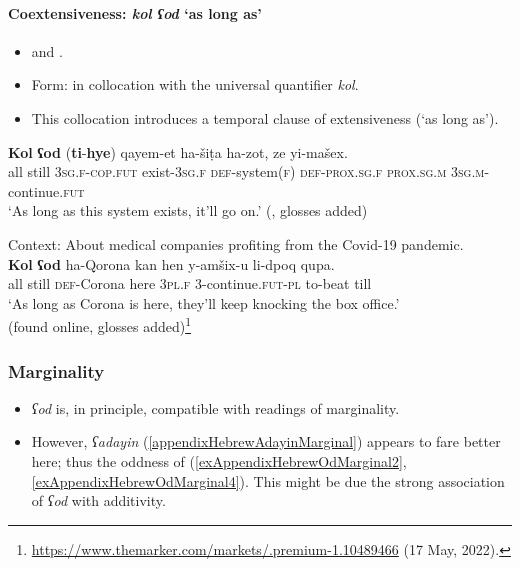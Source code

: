 \paragraph{Coextensiveness: \textit{kol ʕod} \lq as long as'}
\label{appendixHebrewOdAsLongAs}
\begin{itemize}
	\item \textcite[548]{Glinert1989} and \textcite[37]{Schwarzwald2001}.
	\item Form: in collocation with the universal quantifier \textit{kol}.
	\item This collocation introduces a temporal clause of extensiveness (\lq as long as').
\end{itemize}	
\begin{exe}
\ex
	\gll \textbf{Kol} \textbf{ʕod} (\textbf{ti}-\textbf{hye}) qayem-et ha-šiṭa ha-zot, ze yi-mašex.\\
	all still \phantom{(}3\textsc{sg}.\textsc{f}-\textsc{cop}.\textsc{fut} exist-3\textsc{sg}.\textsc{f} \textsc{def}-system(\textsc{f}) \textsc{def}-\textsc{prox}.\textsc{sg}.\textsc{f} \textsc{prox}.\textsc{sg}.\textsc{m} 3\textsc{sg}.\textsc{m}-continue.\textsc{fut}\\
	\glt \lq As long as this system exists, it'll go on.\rq{ }(\cite[548]{Glinert1989}, glosses added)
	
	\ex Context: About medical companies profiting from the Covid-19 pandemic.\\
	\gll \textbf{Kol} \textbf{ʕod} ha-Qorona kan hen y-amšix-u li-dpoq qupa.\\
all still \textsc{def}-Corona here 3\textsc{pl}.\textsc{f} 3-continue.\textsc{fut}-\textsc{pl} to-beat till\\
	\glt \lq As long as Corona is here, they'll keep knocking the box office.'\\(found online, glosses added)\footnote{\url{https://www.themarker.com/markets/.premium-1.10489466} (17 May, 2022).}
\end{exe}
	
\subsubsection{Marginality}
\label{appendixHebrewOdMarginal}
\begin{itemize}
	\item \textit{ʕod} is, in principle, compatible with readings of marginality. 
	\item However, \textit{ʕadayin} (\ref{appendixHebrewAdayinMarginal}) appears to fare better here; thus the oddness of (\ref{exAppendixHebrewOdMarginal2}, \ref{exAppendixHebrewOdMarginal4}). This might be due the strong association of \textit{ʕod} with additivity.
\end{itemize}

